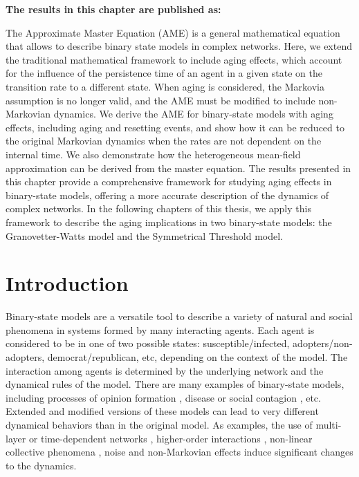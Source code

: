 \vspace{-1.5cm}
\small
\textbf{The results in this chapter are published as:}
\vspace{0.05 cm}

\normalsize
\vspace{0.5 cm}

The Approximate Master Equation (AME) is a general mathematical equation that allows to describe binary state models in complex networks. Here, we extend the traditional mathematical framework to include aging effects, which account for the influence of the persistence time of an agent in a given state on the transition rate to a different state. When aging is considered, the Markovia assumption is no longer valid, and the AME must be modified to include non-Markovian dynamics. We derive the AME for binary-state models with aging effects, including aging and resetting events, and show how it can be reduced to the original Markovian dynamics when the rates are not dependent on the internal time. We also demonstrate how the heterogeneous mean-field approximation can be derived from the master equation. The results presented in this chapter provide a comprehensive framework for studying aging effects in binary-state models, offering a more accurate description of the dynamics of complex networks. In the following chapters of this thesis, we apply this framework to describe the aging implications in two binary-state models: the Granovetter-Watts model and the Symmetrical Threshold model.

\section{\label{sec:Introduction_binary} Introduction}

Binary-state models are a versatile tool to describe a variety of natural and social phenomena in systems formed by many interacting agents. Each agent is considered to be in one of two possible states: susceptible/infected, adopters/non-adopters, democrat/republican, etc, depending on the context of the model. The interaction among agents is determined by the underlying network and the dynamical rules of the model. There are many examples of binary-state models, including processes of opinion formation \cite{Voter-original,sood-2005,fernandez-gracia-2014,redner-2019}, disease or social contagion \cite{granovetter-1978,pastor-satorras-2015}, etc. Extended and modified versions of these models can lead to very different dynamical behaviors than in the original model. As examples, the use of multi-layer  \cite{diakonova-2014,diakonova-2016,amato-2017} or time-dependent networks \cite{vazquez-2008}, higher-order interactions \cite{de-arruda-2020, iacopini-2019, cencetti-2021}, non-linear collective phenomena \cite{castellano-2009,peralta-2018}, noise \cite{carro-2016} and non-Markovian \cite{van-mieghem-2013,starnini-2017,peralta-2020A,chen-2020} effects induce significant changes to the dynamics.

